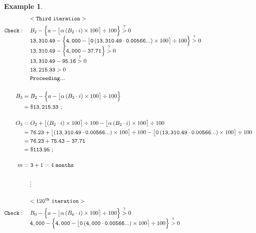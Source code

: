 \documentclass[12pt,letterpaper,oneside]{article}
\newtheorem{example}{Example}[section]
\theoremstyle{remark} %
\begin{document}
\begin{example}
\begin{align*}
	&\quad\;\mathtt{<Third\ iteration>}\\
	\mathtt{Check:}&\quad\;B_{\monthsitc}-\Big\{a-\big\lfloor{\alpha\left(B_{\monthsitc}\cdot i\right)\times 100}\big\rceil\div 100\Big\}\overset{?}{>}0\\[-6pt]
	&\quad\;\mathtt{\balanceitc}-\Big\{\mathtt{\amount}-\big\lfloor{\mathtt{\proportion}\left(\mathtt{\balanceitc}\cdot \mathtt{\rate}\right)\times 100}\big\rceil\div 100\Big\}\overset{?}{>}0\\[-6pt]
	&\quad\;\mathtt{\balanceitc}-\Big\{\mathtt{\amount}-\mathtt{37.71}\Big\}\overset{?}{>}0\\[-6pt]
	&\quad\;\mathtt{\balanceitc}-\mathtt{95.16}\overset{?}{>}0\\
	&\quad\;\mathtt{13,215.33}>0\\
	&\quad\;\mathtt{Proceeding...}\\[12pt]
	B_{\monthspitc}&=B_{\monthsitc}-\Big\{a-\big\lfloor{\alpha\left(B_{\monthsitc}\cdot i\right)\times 100}\big\rceil\div 100\Big\}\\
	&=\mathtt{\$13,215.33}\ ;\\[12pt]
	O_{\monthspitc}&=O_{\monthsitc}+\big\lfloor{\left(B_{\monthsitc}\cdot i\right)\times 100}\big\rceil\div 100-\big\lfloor{\alpha\left(B_{\monthsitc}\cdot i\right)\times 100}\big\rceil\div 100\\
	&=\mathtt{\interestitc}+\big\lfloor{\left(\mathtt{\balanceitc}\cdot \mathtt{\rate}\right)\times 100}\big\rceil\div 100-\big\lfloor{\mathtt{\proportion}\left(\mathtt{\balanceitc}\cdot \mathtt{\rate}\right)\times 100}\big\rceil\div 100\\
	&=\mathtt{\interestitc}+\mathtt{75.43}-\mathtt{37.71}\\
	&=\mathtt{\$113.95}\ ;\\[12pt]
	m&=\mathtt{\monthspitc}+1=4\mathtt{\ months}\\[12pt]
	&\quad\;\vdots\\[12pt]
	&\quad\;\mathtt{<120^{th}\ iteration>}\\
	\mathtt{Check:}&\quad\;B_{\monthsitf}-\Big\{a-\big\lfloor{\alpha\left(B_{\monthsitf}\cdot i\right)\times 100}\big\rceil\div 100\Big\}\overset{?}{>}0\\[-6pt]
	&\quad\;\mathtt{\balanceitf}-\Big\{\mathtt{\amount}-\big\lfloor{\mathtt{\proportion}\left(\mathtt{\balanceitf}\cdot \mathtt{\rate}\right)\times 100}\big\rceil\div 100\Big\}\overset{?}{>}0\\[-6pt]

\end{align*}
\end{example}
\end{document}

